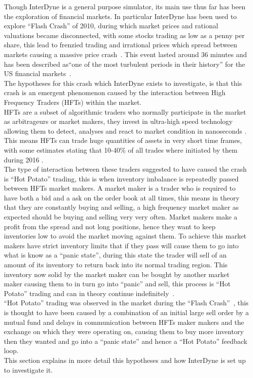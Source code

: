 \documentclass{article}
\begin{document}
Though InterDyne is a general purpose simulator, its main use thus far has been the exploration of financial markets. In particular InterDyne has been used to explore ``Flash Crash'' of 2010, during which market prices and rational valuations became disconnected, with some stocks trading as low as a penny per share, this lead to frenzied trading and irrational prices which spread between markets causing a massive price crash~\cite{SECreport_delays}. This event lasted around 36 minutes and has been described as``one of the most turbulent periods in their history'' for the US financial markets~\cite{Impact_hft}.\\
The hypotheses for this crash which InterDyne exists to investigate, is that this crash is an emergent phenomenon caused by the interaction between High Frequency Traders (HFTs) within the market.\\
HFTs are a subset of algorithmic traders who normally participate in the market as arbitrageurs or market makers, they invest in ultra-high speed technology allowing them to detect, analyses and react to market condition in nanoseconds \cite{hftinformation1}. This means HFTs can trade huge quantities of assets in very short time frames, with some estimates stating that 10-40\% of all trades where initiated by them during 2016 \cite{hftmarketparticipation}.\\
The type of interaction between these traders suggested to have caused the crash is ``Hot Potato'' trading, this is when inventory imbalance is repeatedly passed between HFTs market makers. A market maker is a trader who is required to have both a bid and a ask on the order book at all times, this means in theory that they are constantly buying and selling, a high frequency market maker as expected should be buying and selling very very often. Market makers make a profit from the spread and not long positions, hence they want to keep inventories low to avoid the market moving against them. To achieve this market makers have strict inventory limits that if they pass will cause them to go into what is know as a ``panic state'', during this state the trader will sell of an amount of its inventory to return back into its normal trading region. This inventory now solid by the market maker can be bought by another market maker causing them to in turn go into ``panic'' and sell, this process is ``Hot Potato'' trading and can in theory continue indefinitely~\cite{Elias_Paper}.\\
``Hot Potato'' trading was observed in the market during the ``Flash Crash''~\cite{SECreport_delays}, this is thought to have been caused by a combination of an initial large sell order by a mutual fund and delays in communication between HFTs maker makers and the exchange on which they were operating on, causing them to buy more inventory then they wanted and go into a ``panic state'' and hence a ``Hot Potato'' feedback loop.\\       
This section explains in more detail this hypotheses and how InterDyne is set up to investigate it.  
\end{document}
